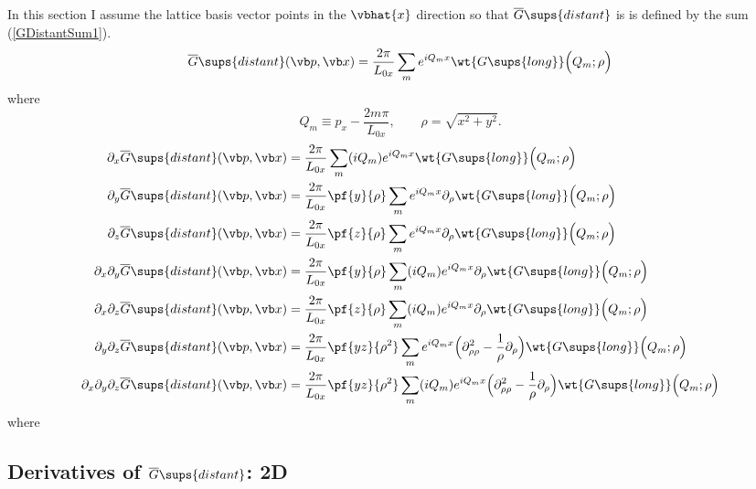 \documentclass[letterpaper]{article}
\newcommand{\GB}{\overline{G}}
\begin{document}
In this section I assume the lattice basis vector points
in the $\vbhat{x}$ direction so that $\GB\sups{distant}$ is 
is defined by the sum (\ref{GDistantSum1}).
\begin{align*}
  \overline{G}\sups{distant}(\vb p, \vb x) 
  =\frac{2\pi}{L_{0x}} \sum_{m} e^{i Q_m x}
   \wt{G\sups{long}}\Big( Q_m; \rho\Big)
\end{align*}
where 
$$Q_m \equiv p_x - \frac{2m\pi}{L_{0x}}, \qquad \rho=\sqrt{x^2 + y^2}.$$
\begin{align*}
 \partial_x 
  \overline{G}\sups{distant}(\vb p, \vb x) 
 &=\frac{2\pi}{L_{0x}} \sum_{m} (iQ_m) e^{i Q_m x}
   \wt{G\sups{long}}\Big( Q_m; \rho\Big)
\\
 \partial_y 
  \overline{G}\sups{distant}(\vb p, \vb x) 
 &=\frac{2\pi}{L_{0x}} \pf{y}{\rho} \sum_{m} e^{i Q_m x}
   \partial_\rho \wt{G\sups{long}}\Big( Q_m; \rho\Big)
\\
 \partial_z 
  \overline{G}\sups{distant}(\vb p, \vb x) 
 &=\frac{2\pi}{L_{0x}} \pf{z}{\rho} \sum_{m} e^{i Q_m x}
   \partial_\rho \wt{G\sups{long}}\Big( Q_m; \rho\Big)
\\
 \partial_x \partial_y
  \overline{G}\sups{distant}(\vb p, \vb x) 
 &=\frac{2\pi}{L_{0x}} \pf{y}{\rho} \sum_{m} (iQ_m) e^{i Q_m x}
   \partial_\rho \wt{G\sups{long}}\Big( Q_m; \rho\Big)
\\
 \partial_x \partial_z
  \overline{G}\sups{distant}(\vb p, \vb x) 
 &=\frac{2\pi}{L_{0x}} \pf{z}{\rho} \sum_{m} (iQ_m) e^{i Q_m x}
   \partial_\rho \wt{G\sups{long}}\Big( Q_m; \rho\Big)
\\
 \partial_y \partial_z
  \overline{G}\sups{distant}(\vb p, \vb x) 
 &=\frac{2\pi}{L_{0x}} \pf{yz}{\rho^2} \sum_{m} e^{i Q_m x}
   \Big( \partial^2_{\rho\rho} -\frac{1}{\rho}\partial_\rho\Big)
   \wt{G\sups{long}}\Big( Q_m; \rho\Big)
\\
 \partial_x \partial_y \partial_z
  \overline{G}\sups{distant}(\vb p, \vb x) 
 &=\frac{2\pi}{L_{0x}} \pf{yz}{\rho^2} \sum_{m} (iQ_m) e^{i Q_m x}
   \Big( \partial^2_{\rho\rho} -\frac{1}{\rho}\partial_\rho\Big)
   \wt{G\sups{long}}\Big( Q_m; \rho\Big)
\end{align*}
where 

\subsection{Derivatives of $\GB\sups{distant}$: 2D}
\end{document}
